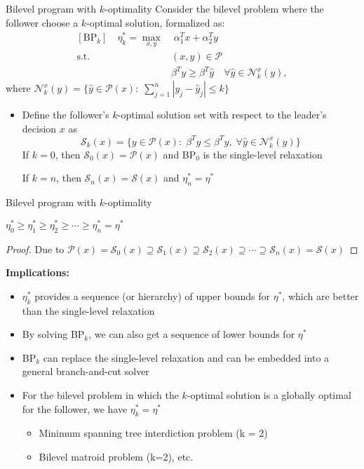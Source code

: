 \documentclass{beamer}
\begin{document}
\begin{frame}{Bilevel program with $k$-optimality} \small
	Consider the bilevel problem where the follower choose a $k$-optimal solution, formalized as:
	\begin{align*}
	[\text{BP}_k]\quad   \eta_k^* = \max_{x, y}& \; \alpha_1^Tx + \alpha_2^T y \\
	\text{s.t.~} & (x, y)\in \mathcal{P} \\
	& \beta^T y \geq \beta^T \hat{y} \quad \forall \hat{y} \in \mathcal{N}_k^x(y),
	\end{align*}
	where $\mathcal{N}_k^x(y) = \{\hat{y} \in \mathcal{P}(x):\; \sum_{j=1}^n |y_j - \hat{y}_j| \leq k \}$
	\begin{itemize}
		\item Define the follower's $k$-optimal solution set with respect to the leader's decision $x$ as 
		\[ \mathcal{S}_k(x) = \{y\in \mathcal{P}(x):\; \beta^Ty \leq \beta^T \hat{y},\; \forall \hat{y} \in \mathcal{N}_k^x(y) \}\]
		If $k = 0$, then $\mathcal{S}_0(x) = \mathcal{P}(x)$ and BP$_0$ is the single-level relaxation 
		
		If $k = n$, then $\mathcal{S}_n(x) = \mathcal{S}(x)$ and $\eta_n^* = \eta^*$
	\end{itemize}

	

\end{frame}

\begin{frame}{Bilevel program with $k$-optimality} \small
	\begin{theorem}
		$\eta_0^* \geq \eta_1^* \geq \eta_2^* \geq \cdots \geq \eta_n^* = \eta^*$
	\end{theorem}
	\begin{proof}
		Due to $\mathcal{P}(x) = \mathcal{S}_0(x) \supseteq \mathcal{S}_1(x) \supseteq \mathcal{S}_2(x) \supseteq \cdots \supseteq \mathcal{S}_n(x) = \mathcal{S}(x)$
	\end{proof} \pause
	\vspace{0.5cm}
	\textbf{Implications:}
	\begin{itemize}
		\item $\eta_k^*$ provides a sequence (or  hierarchy) of upper bounds for $\eta^*$, which are better than the single-level relaxation
		\item By solving BP$_k$, we can also get a sequence of lower bounds for $\eta^*$
		\item BP$_k$ can replace the single-level relaxation and can be embedded into a general branch-and-cut solver
		\item For the bilevel problem in which the $k$-optimal solution is a globally optimal for the follower, we have $\eta_k^* = \eta^*$
		\begin{itemize}
			\item Minimum spanning tree interdiction problem (k = 2)
			\item Bilevel matroid problem (k=2), etc.
		\end{itemize}
	\end{itemize}
\end{frame}
\end{document}
